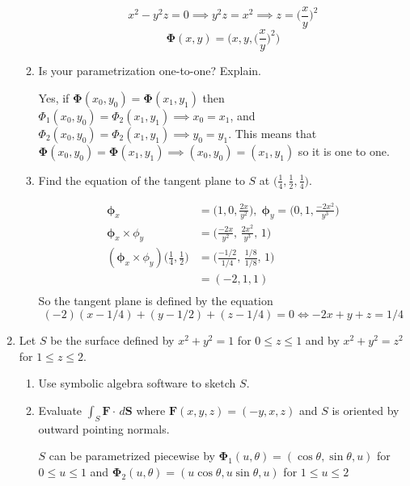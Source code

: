 \documentclass{article}
\begin{document}
\begin{enumerate}
\begin{enumerate}
            \[x^2 - y^2z = 0 \implies y^2z = x^2 \implies z = \bigg(\frac{x}{y}\bigg)^2\]
            \[\boldsymbol \Phi (x,y) = \Bigg(x, y, \bigg(\frac{x}{y}\bigg)^2\Bigg)\]
            
            \item Is your parametrization one-to-one? Explain.

            Yes, if $\boldsymbol \Phi (x_0,y_0) = \boldsymbol \Phi (x_1,y_1)$ then $\Phi_1(x_0,y_0) = \Phi_2(x_1,y_1) \implies x_0 = x_1$, and $\Phi_2(x_0,y_0) = \Phi_2(x_1,y_1) \implies y_0 = y_1$. This means that $\boldsymbol \Phi (x_0, y_0) = \boldsymbol \Phi (x_1, y_1) \implies (x_0, y_0) = (x_1, y_1)$ so it is one to one.
            
            \item Find the equation of the tangent plane to $S$ at $\displaystyle \bigg( \frac{1}{4}, \frac{1}{2}, \frac{1}{4} \bigg).$

            \begin{align*}
                \boldsymbol \phi_x &= \bigg(1, 0, \frac{2x}{y^2}\bigg), \; \boldsymbol \phi_y = \bigg(0, 1, \frac{-2x^2}{y^3}\bigg) \\
                \boldsymbol \phi_x \times \phi_y &= \bigg(\frac{-2x}{y^2},\, \frac{2x^2}{y^3},\, 1\bigg) \\
                (\boldsymbol \phi_x \times \phi_y) \bigg(\frac{1}{4}, \frac{1}{2}\bigg) &= \bigg(\frac{-1/2}{1/4},\, \frac{1/8}{1/8},\, 1\bigg) \\
                &=(-2,1,1) \\
            \end{align*}
            So the tangent plane is defined by the equation \[ (-2)(x - 1/4) + (y - 1/2) + (z - 1/4) = 0 \Leftrightarrow-2x + y + z = 1/4 \]
        \end{enumerate}  
    \item Let $S$ be the surface defined by $x^2 + y^2 = 1$ for $0 \leq z \leq 1$ and by $x^2 + y^2 = z^2$ for $1 \leq z \leq 2$.
        \begin{enumerate}
            \item Use symbolic algebra software to sketch $S$.
            
            \item Evaluate $\displaystyle \int_S \boldsymbol F \cdot \, d \boldsymbol S $ where $\boldsymbol F (x,y,z) = (-y,x,z)$ and $S$ is oriented by outward pointing normals.

            $S$ can be parametrized piecewise by $\boldsymbol \Phi_1 (u, \theta) = (\cos \theta, \sin \theta, u)$ for $0 \leq u \leq 1$ and $\boldsymbol \Phi_2 (u, \theta) = (u\cos \theta, u\sin \theta, u)$ for $1 \leq u \leq 2$


\end{enumerate}
\end{enumerate}
\end{document}
